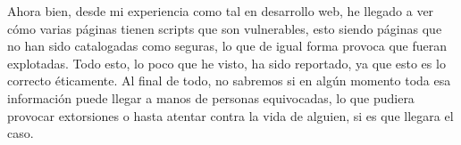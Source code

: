 \documentclass[letterpaper,11pt]{article}
\begin{document}
Ahora bien, desde mi experiencia como tal en desarrollo web, he llegado a ver 
cómo varias páginas tienen scripts que son vulnerables, esto siendo páginas 
que no han sido catalogadas como seguras, 
lo que de igual forma provoca que fueran explotadas. Todo esto, lo poco 
que he visto, ha sido reportado, ya que esto es lo correcto éticamente. Al final de todo, no sabremos si en algún momento 
toda esa información puede llegar a manos de personas equivocadas, lo que pudiera provocar extorsiones 
o hasta atentar contra la vida de alguien, si es que llegara el caso.


\newpage

\nocite{*}
\printbibliography[heading=bibintoc, title={Referencias}]
\end{document}

